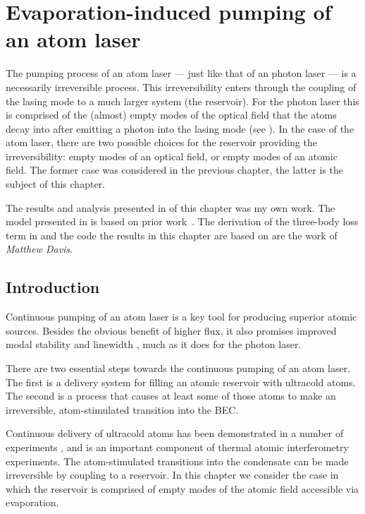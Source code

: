 \chapter{Evaporation-induced pumping of an atom laser}
\label{KineticTheory}
\graphicspath{{Figures/KineticTheory/}{Figures/Common/}}

The pumping process of an atom laser --- just like that of an photon laser --- is a necessarily irreversible process. This irreversibility enters through the coupling of the lasing mode to a much larger system (the reservoir).  For the photon laser this is comprised of the (almost) empty modes of the optical field that the atoms decay into after emitting a photon into the lasing mode (see ).  In the case of the atom laser, there are two possible choices for the reservoir providing the irreversibility: empty modes of an optical field, or empty modes of an atomic field.  The former case was considered in the previous chapter, the latter is the subject of this chapter. 

The results and analysis presented in  of this chapter was my own work.  The model presented in  is based on prior work~\citep{Davis:2000vn,Bijlsma:2000}.  The derivation of the three-body loss term in  and the code the results in this chapter are based on are the work of \emph{Matthew Davis}.

\section{Introduction}

Continuous pumping of an atom laser is a key tool for producing superior atomic sources. Besides the obvious benefit of higher flux, it also promises improved modal stability \citep{Haine:2002kp,Haine:2003fs} and linewidth \citep{Johnsson:2007}, much as it does for the photon laser.

There are two essential steps towards the continuous pumping of an atom laser. The first is a delivery system for filling an atomic reservoir with ultracold atoms. The second is a process that causes at least some of those atoms to make an irreversible, atom-stimulated transition into the BEC.

Continuous delivery of ultracold atoms has been demonstrated in a number of experiments \citep{Schmid:2006,Lahaye:2004,Greiner:2001,Greiner:2007,Streed:2006,Muller:2007}, and is an important component of thermal atomic interferometry experiments.  The atom-stimulated transitions into the condensate can be made irreversible by coupling to a reservoir. In this chapter we consider the case in which the reservoir is comprised of empty modes of the atomic field accessible via evaporation.

